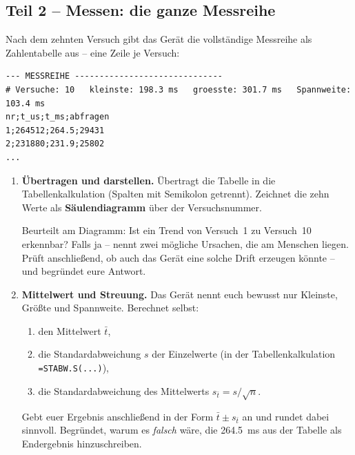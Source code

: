\documentclass[a4paper,12pt]{scrartcl}
\begin{document}
\subsection*{Teil 2 -- Messen: die ganze Messreihe}

\noindent Nach dem zehnten Versuch gibt das Gerät die vollständige Messreihe als Zahlentabelle
aus -- eine Zeile je Versuch:

\begin{center}
\begin{lstlisting}[style=monitor]
--- MESSREIHE ------------------------------
# Versuche: 10   kleinste: 198.3 ms   groesste: 301.7 ms   Spannweite: 103.4 ms
nr;t_us;t_ms;abfragen
1;264512;264.5;29431
2;231880;231.9;25802
...
\end{lstlisting}
\end{center}

\begin{enumerate}[leftmargin=2em, resume, itemsep=9pt, topsep=7pt]
\item \textbf{Übertragen und darstellen.} Übertragt die Tabelle in die Tabellenkalkulation
(Spalten mit Semikolon getrennt). Zeichnet die zehn Werte als \textbf{Säulendiagramm} über der
Versuchsnummer.

\smallskip
Beurteilt am Diagramm: Ist ein Trend von Versuch~1 zu Versuch~10 erkennbar? Falls ja -- nennt
zwei
mögliche Ursachen, die am Menschen liegen. Prüft anschließend, ob auch das Gerät eine solche
Drift erzeugen könnte -- und begründet eure Antwort.

\item \textbf{Mittelwert und Streuung.} Das Gerät nennt euch bewusst nur Kleinste, Größte und
Spannweite. Berechnet selbst:
  \begin{enumerate}[label=(\alph*), leftmargin=2em, itemsep=6pt, topsep=5pt]
  \item den Mittelwert $\bar{t}$,
  \item die Standardabweichung $s$ der Einzelwerte (in der Tabellenkalkulation
        \texttt{=STABW.S(...)}),
  \item die Standardabweichung des Mittelwerts $s_{\bar{t}} = s/\sqrt{n}$.
  \end{enumerate}

\smallskip
Gebt euer Ergebnis anschließend in der Form $\bar{t} \pm s_{\bar{t}}$ an und rundet dabei
sinnvoll. Begründet, warum es \emph{falsch} wäre, die \SI{264,5}{\milli\second} aus der Tabelle
als Endergebnis hinzuschreiben.
\end{enumerate}
\end{document}
